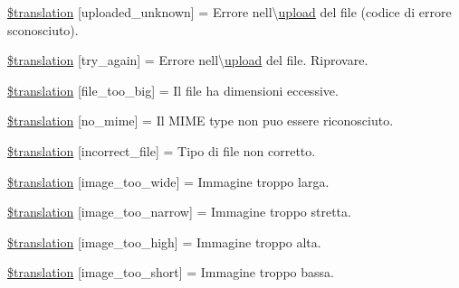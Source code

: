 \begin{DoxyCompactItemize}
\item 
\hyperlink{class_8upload_8it___i_t_8php_a4a9168e922b827e6a28b5db1c00774ca}{\$translation} \mbox{[}\textquotesingle{}uploaded\+\_\+unknown\textquotesingle{}\mbox{]} = \textquotesingle{}Errore nell\textbackslash{}\textquotesingle{}\hyperlink{classupload}{upload} del file (codice di errore sconosciuto).\textquotesingle{}
\item 
\hyperlink{class_8upload_8it___i_t_8php_a3afc377bd803683314f413a814243066}{\$translation} \mbox{[}\textquotesingle{}try\+\_\+again\textquotesingle{}\mbox{]} = \textquotesingle{}Errore nell\textbackslash{}\textquotesingle{}\hyperlink{classupload}{upload} del file. Riprovare.\textquotesingle{}
\item 
\hyperlink{class_8upload_8it___i_t_8php_a476278eb4a0c3df56af068e2d511a741}{\$translation} \mbox{[}\textquotesingle{}file\+\_\+too\+\_\+big\textquotesingle{}\mbox{]} = \textquotesingle{}Il file ha dimensioni eccessive.\textquotesingle{}
\item 
\hyperlink{class_8upload_8it___i_t_8php_a191a55df8e3bb7f3c51b70f3c1932e02}{\$translation} \mbox{[}\textquotesingle{}no\+\_\+mime\textquotesingle{}\mbox{]} = \textquotesingle{}Il M\+I\+M\+E type non puo essere riconosciuto.\textquotesingle{}
\item 
\hyperlink{class_8upload_8it___i_t_8php_a4d32343e2699edd6fd435f9c832cb9c7}{\$translation} \mbox{[}\textquotesingle{}incorrect\+\_\+file\textquotesingle{}\mbox{]} = \textquotesingle{}Tipo di file non corretto.\textquotesingle{}
\item 
\hyperlink{class_8upload_8it___i_t_8php_a0dd3e4930ca1f59ae280f4b1006525cd}{\$translation} \mbox{[}\textquotesingle{}image\+\_\+too\+\_\+wide\textquotesingle{}\mbox{]} = \textquotesingle{}Immagine troppo larga.\textquotesingle{}
\item 
\hyperlink{class_8upload_8it___i_t_8php_a5c9a4cd67fd21c32e0a3b434591a6037}{\$translation} \mbox{[}\textquotesingle{}image\+\_\+too\+\_\+narrow\textquotesingle{}\mbox{]} = \textquotesingle{}Immagine troppo stretta.\textquotesingle{}
\item 
\hyperlink{class_8upload_8it___i_t_8php_aa27bde361343f3b63c7cd441860024f8}{\$translation} \mbox{[}\textquotesingle{}image\+\_\+too\+\_\+high\textquotesingle{}\mbox{]} = \textquotesingle{}Immagine troppo alta.\textquotesingle{}
\item 
\hyperlink{class_8upload_8it___i_t_8php_a86fcd4e1157b00032df451188d735527}{\$translation} \mbox{[}\textquotesingle{}image\+\_\+too\+\_\+short\textquotesingle{}\mbox{]} = \textquotesingle{}Immagine troppo bassa.\textquotesingle{}

\end{DoxyCompactItemize}
